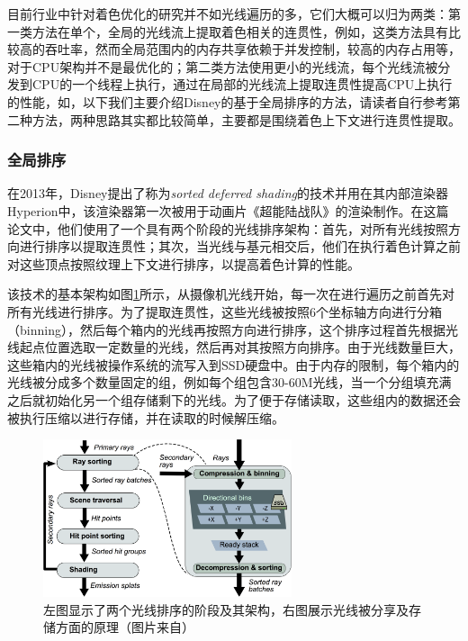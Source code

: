 目前行业中针对着色优化的研究并不如光线遍历的多，它们大概可以归为两类：第一类方法在单个，全局的光线流上提取着色相关的连贯性，例如\cite{a:SortedDeferredShadingforProductionPathTracing}，这类方法具有比较高的吞吐率，然而全局范围内的内存共享依赖于并发控制，较高的内存占用等，对于CPU架构并不是最优化的；第二类方法使用更小的光线流，每个光线流被分发到CPU的一个线程上执行，通过在局部的光线流上提取连贯性提高CPU上执行的性能，如\cite{a:LocalShadingCoherenceExtractionforSIMD-EfficientPathTracingonCPUs}，以下我们主要介绍Disney的基于全局排序的方法，请读者自行参考第二种方法，两种思路其实都比较简单，主要都是围绕着色上下文进行连贯性提取。






\subsubsection{全局排序} 
在2013年，Disney提出了称为\textit{sorted deferred shading}\cite{a:SortedDeferredShadingforProductionPathTracing}的技术并用在其内部渲染器Hyperion中，该渲染器第一次被用于动画片《超能陆战队》的渲染制作。在这篇论文中，他们使用了一个具有两个阶段的光线排序架构：首先，对所有光线按照方向进行排序以提取连贯性；其次，当光线与基元相交后，他们在执行着色计算之前对这些顶点按照纹理上下文进行排序，以提高着色计算的性能。

该技术的基本架构如图\ref{f:pt-sorted-deferred-shading}所示，从摄像机光线开始，每一次在进行遍历之前首先对所有光线进行排序。为了提取连贯性，这些光线被按照6个坐标轴方向进行分箱（binning），然后每个箱内的光线再按照方向进行排序，这个排序过程首先根据光线起点位置选取一定数量的光线，然后再对其按照方向排序。由于光线数量巨大，这些箱内的光线被操作系统的流写入到SSD硬盘中。由于内存的限制，每个箱内的光线被分成多个数量固定的组，例如每个组包含30-60M光线，当一个分组填充满之后就初始化另一个组存储剩下的光线。为了便于存储读取，这些组内的数据还会被执行压缩以进行存储，并在读取的时候解压缩。

\begin{figure}
\sidecaption
	\includegraphics[width=0.65\textwidth]{figures/pt/path-10}
	\caption{左图显示了两个光线排序的阶段及其架构，右图展示光线被分享及存储方面的原理（图片来自\cite{a:SortedDeferredShadingforProductionPathTracing}）}
	\label{f:pt-sorted-deferred-shading}
\end{figure}

